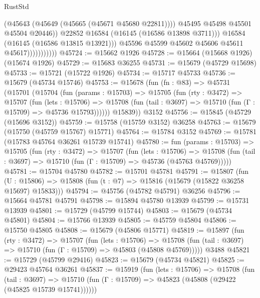 \begin{lexlean}{RustStd}
\begin{coremodule}
                                  (@45643 (@45649 (@45665 (@45671 @45680 @22811))))
                                  @45495
                                  @45498
                                  @45501
                                  @45504
                                  @20446))
                              @22852
                              @16584
                              (@16145 (@16586 @13898 @3711)))
                            @16584
                            (@16145 (@16586 @13815 @13921)))
                          @45596
                          @45599
                          @45602
                          @45606
                          @45611
                          @45617)))))))))))
@45724 := @15662 @1926
@45728 := @15664 (@15668 @1926) (@15674 @1926)
@45729 := @15683 @36255
@45731 := @15679 (@45729 @15698)
@45733 := @15721 (@15722 @1926)
@45734 := @15717 @45733
@45736 := @15679 (@45734 @15746)
@45753 := @15678
    (fun (fn : @83) =>
    @45731
      (@15701
        (@15704
          (fun (params : @15703) =>
          @15705
            (fun (rty : @3472) =>
            @15707
              (fun (lets : @15706) =>
              @15708 (fun (tail : @3697) => @15710 (fun (Γ : @15709) => @45736 @15793))))))
        @15839))
    @3152
@45756 := @15845 (@45729 (@15696 @3152))
@45759 := @15758 (@15759 @3152) @36258
@45763 := @15679 (@15750 (@45759 @15767) @15771)
@45764 := @15784 @3152
@45769 := @15781 (@15783 @45764 @36261 @15739 @15741)
@45780 := fun (params : @15703) =>
  @15705
    (fun (rty : @3472) =>
    @15707
      (fun (lets : @15706) =>
      @15708 (fun (tail : @3697) => @15710 (fun (Γ : @15709) => @45736 (@45763 @45769)))))
@45781 := @15704 @45780
@45782 := @15701 @45781
@45791 := @15807
    (fun (U : @15806) => @15808 (fun (t : @7) => @15816 (@15679 (@15822 @36258 @15697) @15833)))
@45794 := @45756 (@45782 @45791) @36256
@45796 := @15664 @45781 @45791
@45798 := @15894 @45780 @13939
@45799 := @15731 @13939
@45801 := @15729 (@45799 @15744)
@45803 := @15679 (@45734 @45801)
@45804 := @15766 @13939
@45805 := @45759 @45804
@45806 := @15750 @45805
@45808 := @15679 (@45806 @15771)
@45819 := @15897
    (fun (rty : @3472) =>
    @15707
      (fun (lets : @15706) =>
      @15708 (fun (tail : @3697) => @15710 (fun (Γ : @15709) => @45803 (@45808 @45769)))))
    @3488
@45821 := @15729 (@45799 @29416)
@45823 := @15679 (@45734 @45821)
@45825 := @29423 @45764 @36261
@45837 := @15919
    (fun (lets : @15706) =>
    @15708
      (fun (tail : @3697) =>
      @15710 (fun (Γ : @15709) => @45823 (@45808 (@29422 (@45825 @15739 @15741))))))

\end{coremodule}
\end{lexlean}
